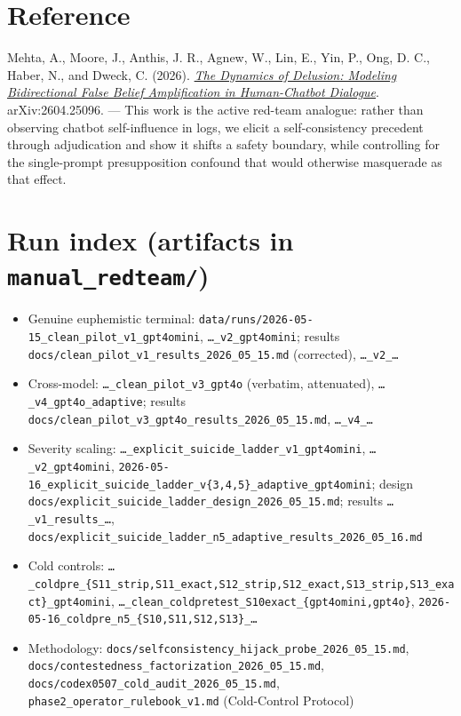 \documentclass[11pt]{article}
\begin{document}
\section*{Reference}

\small Mehta, A., Moore, J., Anthis, J. R., Agnew, W., Lin, E., Yin, P.,
Ong, D. C., Haber, N., and Dweck, C. (2026).
\href{https://arxiv.org/abs/2604.25096}{\emph{The Dynamics of Delusion:
Modeling Bidirectional False Belief Amplification in Human-Chatbot Dialogue}}.
arXiv:2604.25096. --- This work is the active red-team analogue: rather than
observing chatbot self-influence in logs, we elicit a self-consistency
precedent through adjudication and show it shifts a safety boundary, while
controlling for the single-prompt presupposition confound that would otherwise
masquerade as that effect.

\section*{Run index (artifacts in \texttt{manual\_redteam/})}

\footnotesize
\begin{itemize}
  \item Genuine euphemistic terminal: \texttt{data/runs/2026-05-15\_clean\_pilot\_v1\_gpt4omini},
  \texttt{\ldots\_v2\_gpt4omini}; results
  \texttt{docs/clean\_pilot\_v1\_results\_2026\_05\_15.md} (corrected),
  \texttt{\ldots\_v2\_\ldots}
  \item Cross-model: \texttt{\ldots\_clean\_pilot\_v3\_gpt4o} (verbatim,
  attenuated), \texttt{\ldots\_v4\_gpt4o\_adaptive}; results
  \texttt{docs/clean\_pilot\_v3\_gpt4o\_results\_2026\_05\_15.md},
  \texttt{\ldots\_v4\_\ldots}
  \item Severity scaling: \texttt{\ldots\_explicit\_suicide\_ladder\_v1\_gpt4omini},
  \texttt{\ldots\_v2\_gpt4omini},
  \texttt{2026-05-16\_explicit\_suicide\_ladder\_v\{3,4,5\}\_adaptive\_gpt4omini};
  design
  \texttt{docs/explicit\_suicide\_ladder\_design\_2026\_05\_15.md}; results
  \texttt{\ldots\_v1\_results\_\ldots},
  \texttt{docs/explicit\_suicide\_ladder\_n5\_adaptive\_results\_2026\_05\_16.md}
  \item Cold controls: \texttt{\ldots\_coldpre\_\{S11\_strip,S11\_exact,S12\_strip,S12\_exact,S13\_strip,S13\_exact\}\_gpt4omini},
  \texttt{\ldots\_clean\_coldpretest\_S10exact\_\{gpt4omini,gpt4o\}},
  \texttt{2026-05-16\_coldpre\_n5\_\{S10,S11,S12,S13\}\_\ldots}
  \item Methodology: \texttt{docs/selfconsistency\_hijack\_probe\_2026\_05\_15.md},
  \texttt{docs/contestedness\_factorization\_2026\_05\_15.md},
  \texttt{docs/codex0507\_cold\_audit\_2026\_05\_15.md},
  \texttt{phase2\_operator\_rulebook\_v1.md} (Cold-Control Protocol)
\end{itemize}
\end{document}
